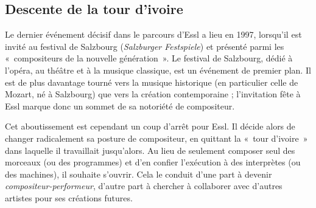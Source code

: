 \documentclass[a4paper,12pt]{article}
\newcommand{\guill}[1]{«~#1~»}
\newcommand{\zitat}[2]{\#Citation(#2)\#}
\begin{document}

\subsection{Descente de la tour d'ivoire}
\label{liberte}

Le dernier événement décisif dans le parcours d'Essl a lieu en 1997, lorsqu'il est invité au festival de Salzbourg (\emph{Salzburger Festspiele}) et présenté parmi les \guill{compositeurs de la nouvelle génération}. Le festival de Salzbourg, dédié à l'opéra, au théâtre et à la musique classique, est un événement de premier plan. Il est de plus davantage tourné vers la musique historique (en particulier celle de Mozart, né à Salzbourg) que vers la création contemporaine ; l'invitation fête à Essl marque donc un sommet de sa notoriété de compositeur.

Cet aboutissement est cependant un coup d'arrêt pour Essl. Il décide alors de changer radicalement sa posture de compositeur, en quittant la \guill{tour d'ivoire} dans laquelle il travaillait jusqu'alors. Au lieu de seulement composer seul des morceaux (ou des programmes) et d'en confier l'exécution à des interprètes (ou des machines), il souhaite s'ouvrir. Cela le conduit d'une part à devenir \emph{compositeur-performeur}, d'autre part à chercher à collaborer avec d'autres artistes pour ses créations futures.
\end{document}
